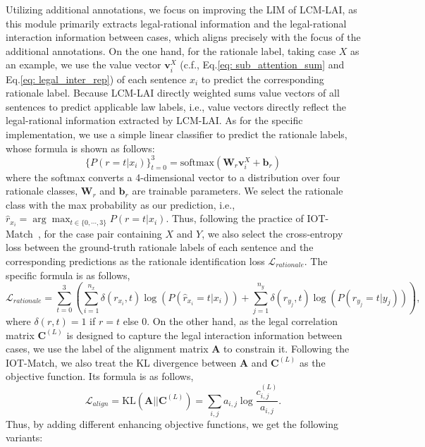 Utilizing additional annotations, we focus on improving the LIM of LCM-LAI, as this module primarily extracts legal-rational information and the legal-rational interaction information between cases, which aligns precisely with the focus of the additional annotations.
On the one hand, for the rationale label, taking case $X$ as an example, we use the value vector $\mathbf{v}_{i}^{X}$ (c.f., Eq.\ref{eq: sub_attention_sum} and Eq.\ref{eq: legal_inter_rep}) of each sentence $x_i$ to predict the corresponding rationale label.
Because LCM-LAI directly weighted sums value vectors of all sentences to predict applicable law labels, i.e., 
value vectors directly reflect the legal-rational information extracted by LCM-LAI.
As for the specific implementation, we use a simple linear classifier to predict the rationale labels, whose formula is shown as follows:
\[
\{ P(r=t | x_i) \}_{t=0}^{3} = \text{softmax}(\mathbf{W}_{r}\mathbf{v}_i^X + \mathbf{b}_{r} )
\]
where the softmax converts a 4-dimensional vector to a distribution over four rationale classes, $\mathbf{W}_{r}$ and $\mathbf{b}_{r}$ are trainable parameters.
We select the rationale class with the max probability as our prediction, i.e., 
$\hat{r}_{x_i} = \arg \max_{t\in \{0, \cdots, 3\}}P\left ( r=t| x_i\right)$.
Thus, following the practice of IOT-Match~\cite{yu2022Explainable}, for the case pair containing $X$ and $Y$, we also select the cross-entropy loss between the ground-truth rationale labels of each sentence and the corresponding predictions as the rationale identification loss $\mathscr{L}_{rationale}$.
The specific formula is as follows,
\[
    \mathscr{L}_{rationale} = \sum_{t=0}^{3}\left( 
    \sum_{i=1}^{n_x} \delta(r_{x_i}, t) \log \left(P (\hat{r}_{x_i}=t | x_{i}) \right)
    +  \sum_{j=1}^{n_y} \delta(r_{y_j}, t) \log \left(P(\hat{r}_{y_j}=t | y_{j})\right)
    \right),
\]
where $\delta(r, t) = 1$ if $r = t$ else 0. 
On the other hand, as the legal correlation matrix $\mathbf{C}^{(L)}$ is designed to capture the legal interaction information between cases, we use the label of the alignment matrix $\mathbf{A}$ to constrain it.
Following the IOT-Match, we also treat the KL divergence between $\mathbf{A}$ and $\mathbf{C}^{(L)}$ as the objective function.
Its formula is as follows,
\[
    \mathscr{L}_{align} = \text{KL}( \mathbf{A} || \mathbf{C}^{(L)}) = \sum_{i, j} a_{i,j} \log \frac{c_{i, j}^{(L)}}{a_{i,j}}.
\]
Thus, by adding different enhancing objective functions, we get the following variants:
